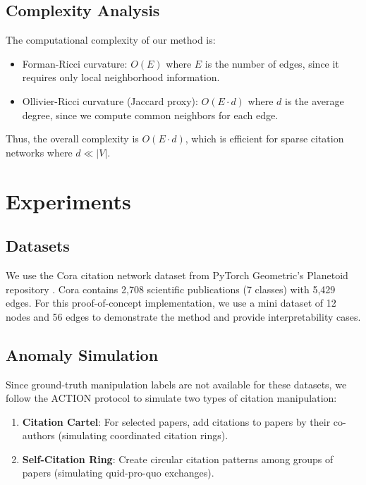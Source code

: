 \documentclass[11pt,letterpaper]{article}
\begin{document}
\subsection{Complexity Analysis}

The computational complexity of our method is:

\begin{itemize}
  \item Forman-Ricci curvature: $O(E)$ where $E$ is the number of edges, since it requires only local neighborhood information.
  \item Ollivier-Ricci curvature (Jaccard proxy): $O(E \cdot d)$ where $d$ is the average degree, since we compute common neighbors for each edge.
\end{itemize}

Thus, the overall complexity is $O(E \cdot d)$, which is efficient for sparse citation networks where $d \ll |V|$.

\section{Experiments}

\subsection{Datasets}

We use the Cora citation network dataset from PyTorch Geometric's Planetoid repository \cite{Yang2016}. Cora contains 2,708 scientific publications (7 classes) with 5,429 edges. For this proof-of-concept implementation, we use a mini dataset of 12 nodes and 56 edges to demonstrate the method and provide interpretability cases.

\subsection{Anomaly Simulation}

Since ground-truth manipulation labels are not available for these datasets, we follow the ACTION protocol \cite{Liu2024} to simulate two types of citation manipulation:

\begin{enumerate}
  \item \textbf{Citation Cartel}: For selected papers, add citations to papers by their co-authors (simulating coordinated citation rings).
  \item \textbf{Self-Citation Ring}: Create circular citation patterns among groups of papers (simulating quid-pro-quo exchanges).
\end{enumerate}
\end{document}
